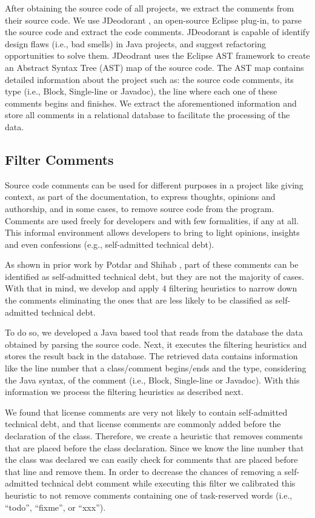 After obtaining the source code of all projects, we extract the comments from their source code. We use JDeodorant \cite{Tsantalis2008CSMR}, an open-source Eclipse plug-in, to parse the source code and extract the code comments. JDeodorant is capable of identify design flaws (i.e., bad smells) in Java projects, and suggest refactoring opportunities to solve them. JDeodrant uses the Eclipse AST framework to create an Abstract Syntax Tree (AST) map of the source code. The AST map contains detailed information about the project such as: the source code comments, its type (i.e., Block, Single-line or Javadoc), the line where each one of these comments begins and finishes. We extract the aforementioned information and store all comments in a relational database to facilitate the processing of the data.

\subsection{Filter Comments} %
\label{sub:filter_comments}

Source code comments can be used for different purposes in a project like giving context, as part of the documentation, to express thoughts, opinions and authorship, and in some cases, to remove source code from the program. Comments are used freely for developers and with few formalities, if any at all. This informal environment allows developers to bring to light opinions, insights and even confessions (e.g., self-admitted technical debt). 

As shown in prior work by Potdar and Shihab \cite{Potdar2014ICSME}, part of these comments can be identified as self-admitted technical debt, but they are not the majority of cases. With that in mind, we develop and apply 4 filtering heuristics to narrow down the comments eliminating the ones that are less likely to be classified as self-admitted technical debt.

To do so, we developed a Java based tool that reads from the database the data obtained by parsing the source code. Next, it executes the filtering heuristics and stores the result back in the database. The retrieved data contains information like the line number that a class/comment begins/ends and the type, considering the Java syntax, of the comment (i.e., Block, Single-line or Javadoc). With this information we process the filtering heuristics as described next.

We found that license comments are very not likely to contain self-admitted technical debt, and that license comments are commonly added before the declaration of the class. Therefore, we create a heuristic that removes comments that are placed before the class declaration. Since we know the line number that the class was declared we can easily check for comments that are placed before that line and remove them. In order to decrease the chances of removing a self-admitted technical debt comment while executing this filter we calibrated this heuristic to not remove comments containing one of task-reserved words (i.e., ``todo'', ``fixme'', or ``xxx'').

